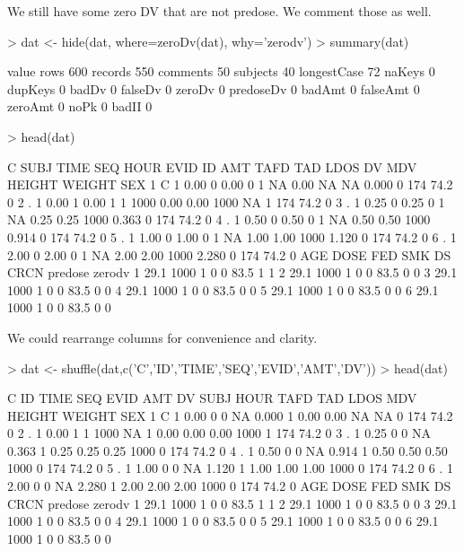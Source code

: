 We still have some zero DV that are not predose.  We comment those as well.
\begin{Schunk}
\begin{Sinput}
> dat <- hide(dat, where=zeroDv(dat), why='zerodv')
> summary(dat)
\end{Sinput}
\begin{Soutput}
            value
rows          600
records       550
comments       50
subjects       40
longestCase    72
naKeys          0
dupKeys         0
badDv           0
falseDv         0
zeroDv          0
predoseDv       0
badAmt          0
falseAmt        0
zeroAmt         0
noPk            0
badII           0
\end{Soutput}
\begin{Sinput}
> head(dat)
\end{Sinput}
\begin{Soutput}
  C SUBJ TIME SEQ HOUR EVID ID  AMT TAFD  TAD LDOS    DV MDV HEIGHT WEIGHT SEX
1 C    1 0.00   0 0.00    0  1   NA 0.00   NA   NA 0.000   0    174   74.2   0
2 .    1 0.00   1 0.00    1  1 1000 0.00 0.00 1000    NA   1    174   74.2   0
3 .    1 0.25   0 0.25    0  1   NA 0.25 0.25 1000 0.363   0    174   74.2   0
4 .    1 0.50   0 0.50    0  1   NA 0.50 0.50 1000 0.914   0    174   74.2   0
5 .    1 1.00   0 1.00    0  1   NA 1.00 1.00 1000 1.120   0    174   74.2   0
6 .    1 2.00   0 2.00    0  1   NA 2.00 2.00 1000 2.280   0    174   74.2   0
   AGE DOSE FED SMK DS CRCN predose zerodv
1 29.1 1000   1   0  0 83.5       1      1
2 29.1 1000   1   0  0 83.5       0      0
3 29.1 1000   1   0  0 83.5       0      0
4 29.1 1000   1   0  0 83.5       0      0
5 29.1 1000   1   0  0 83.5       0      0
6 29.1 1000   1   0  0 83.5       0      0
\end{Soutput}
\end{Schunk}
We could rearrange columns for convenience and clarity.
\begin{Schunk}
\begin{Sinput}
> dat <- shuffle(dat,c('C','ID','TIME','SEQ','EVID','AMT','DV'))
> head(dat)
\end{Sinput}
\begin{Soutput}
  C ID TIME SEQ EVID  AMT    DV SUBJ HOUR TAFD  TAD LDOS MDV HEIGHT WEIGHT SEX
1 C  1 0.00   0    0   NA 0.000    1 0.00 0.00   NA   NA   0    174   74.2   0
2 .  1 0.00   1    1 1000    NA    1 0.00 0.00 0.00 1000   1    174   74.2   0
3 .  1 0.25   0    0   NA 0.363    1 0.25 0.25 0.25 1000   0    174   74.2   0
4 .  1 0.50   0    0   NA 0.914    1 0.50 0.50 0.50 1000   0    174   74.2   0
5 .  1 1.00   0    0   NA 1.120    1 1.00 1.00 1.00 1000   0    174   74.2   0
6 .  1 2.00   0    0   NA 2.280    1 2.00 2.00 2.00 1000   0    174   74.2   0
   AGE DOSE FED SMK DS CRCN predose zerodv
1 29.1 1000   1   0  0 83.5       1      1
2 29.1 1000   1   0  0 83.5       0      0
3 29.1 1000   1   0  0 83.5       0      0
4 29.1 1000   1   0  0 83.5       0      0
5 29.1 1000   1   0  0 83.5       0      0
6 29.1 1000   1   0  0 83.5       0      0
\end{Soutput}
\end{Schunk}
